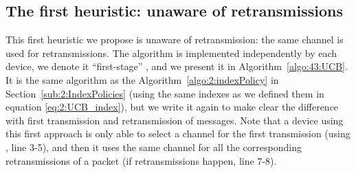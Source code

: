 

\subsection{The first heuristic: \UCB{} unaware of retransmissions}
\label{sub:43:UCBnaive}


This first heuristic we propose is unaware of retransmission: the same channel is used for retransmissions.
The \UCB{} algorithm is implemented independently by each device, we denote it ``first-stage'' \UCB, and we present it in Algorithm~\ref{algo:43:UCB}.
It is the same algorithm as the Algorithm~\ref{algo:2:indexPolicy} in Section~\ref{sub:2:IndexPolicies} (using the same \UCB{} indexes as we defined them in equation \eqref{eq:2:UCB_index}),
but we write it again to make clear the difference with first transmission and retransmission of messages.
%
Note that a device using this first approach is only able to select a channel for the first transmission (using \UCB, line 3-5), and then it uses the same channel for all the corresponding retransmissions of a packet (if retransmissions happen, line 7-8).


